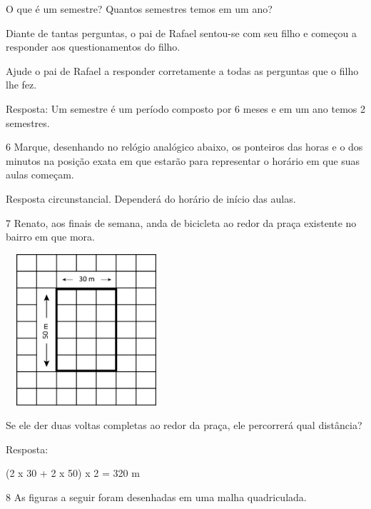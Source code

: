 O que é um semestre? 
Quantos semestres temos em um ano?

Diante de tantas perguntas, o pai de Rafael sentou-se com seu filho e
começou a responder aos questionamentos do filho.

Ajude o pai de Rafael a responder corretamente a todas as perguntas que o filho lhe fez.


Resposta:
Um semestre é um período composto por 6 meses e em um ano temos 2 semestres.

\num{6} Marque, desenhando no relógio analógico abaixo, os ponteiros das horas e o dos
minutos na posição exata em que estarão para representar o horário em que
suas aulas começam.



Resposta circunstancial. Dependerá do horário de início das aulas.


\num{7} Renato, aos finais de semana, anda de bicicleta ao redor da praça existente no bairro em que mora.


\includegraphics[width=2.35256in,height=2.20730in]{media/image55.png}

Se ele der duas voltas completas ao redor da praça, ele percorrerá qual distância?


Resposta:

(2 x 30 + 2 x 50) x 2 = 320 m


\num{8} As figuras a seguir foram desenhadas em uma malha quadriculada.

